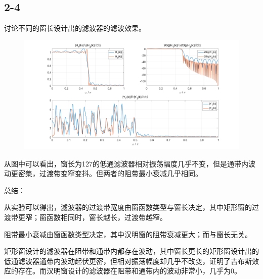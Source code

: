 \documentclass{../source/Experiment}
\begin{document}
\subsection{2-4}
讨论不同的窗长设计出的滤波器的滤波效果。
\begin{figure}[H]
    \centering
    \includegraphics[width = 1\textwidth]{src/exp4-2-4.png}
\end{figure}
从图中可以看出，窗长为127的低通滤波器相对振荡幅度几乎不变，但是通带内波动更密集，过渡带变窄变抖。但两者的阻带最小衰减几乎相同。

总结：

从实验可以得出，滤波器的过渡带宽度由窗函数类型与窗长决定，其中矩形窗的过渡带更窄；窗函数相同时，窗长越长，过渡带越窄。

阻带最小衰减由窗函数类型决定，其中汉明窗的阻带衰减更大；而与窗长无关。

矩形窗设计的滤波器在阻带和通带内都存在波动，其中窗长更长的矩形窗设计出的低通滤波器通带内波动起伏更密，但相对振荡幅度却几乎不改变，证明了吉布斯效应的存在。而汉明窗设计的滤波器在阻带和通带内的波动非常小，几乎为0。
\end{document}
